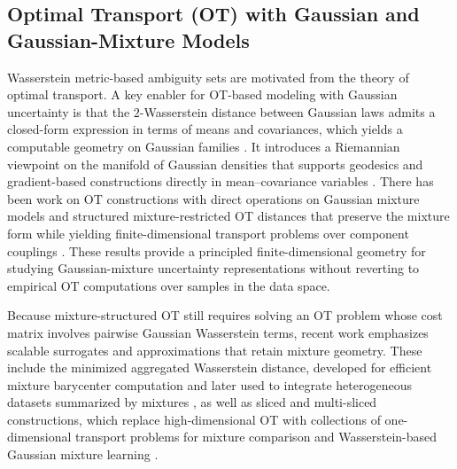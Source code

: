 \documentclass[opre,sglanonrev]{informs4}
\begin{document}


\subsection{Optimal Transport (OT) with Gaussian and Gaussian-Mixture Models}
Wasserstein metric-based ambiguity sets are motivated from the theory of optimal transport. A key enabler for OT-based modeling with Gaussian uncertainty is that the $2$-Wasserstein distance between Gaussian laws admits a closed-form expression in terms of means and covariances, which yields a computable geometry on Gaussian families \cite{gelbrich1990formula,takatsu2011wasserstein}. %
It introduces a Riemannian viewpoint on the manifold of Gaussian densities that supports geodesics and gradient-based constructions directly in mean--covariance variables \cite{malago2018wasserstein}. There has been work on OT constructions with direct operations on Gaussian mixture models \cite{chen2018optimal} and structured mixture-restricted OT distances that preserve the mixture form while yielding finite-dimensional transport problems over component couplings \cite{delon2020wasserstein}. These results provide a principled finite-dimensional geometry for studying Gaussian-mixture uncertainty representations without reverting to empirical OT computations over samples in the data space.

 Because mixture-structured OT still requires solving an OT problem whose cost matrix involves pairwise Gaussian Wasserstein terms, recent work emphasizes scalable surrogates and approximations that retain mixture geometry. These include the minimized aggregated Wasserstein distance, developed for efficient mixture barycenter computation and later used to integrate heterogeneous datasets summarized by mixtures \cite{lin2023maw}, as well as sliced and multi-sliced constructions, which replace high-dimensional OT with collections of one-dimensional transport problems for mixture comparison and Wasserstein-based Gaussian mixture learning \cite{kolouri2018sliced,piening2025double}. 
\end{document}
